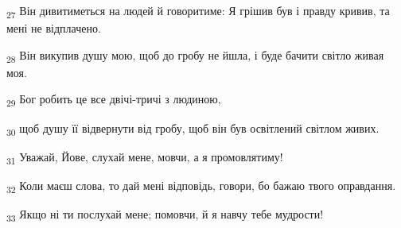 \begin{tcolorbox}
\textsubscript{27} Він дивитиметься на людей й говоритиме: Я грішив був і правду кривив, та мені не відплачено.
\end{tcolorbox}
\begin{tcolorbox}
\textsubscript{28} Він викупив душу мою, щоб до гробу не йшла, і буде бачити світло живая моя.
\end{tcolorbox}
\begin{tcolorbox}
\textsubscript{29} Бог робить це все двічі-тричі з людиною,
\end{tcolorbox}
\begin{tcolorbox}
\textsubscript{30} щоб душу її відвернути від гробу, щоб він був освітлений світлом живих.
\end{tcolorbox}
\begin{tcolorbox}
\textsubscript{31} Уважай, Йове, слухай мене, мовчи, а я промовлятиму!
\end{tcolorbox}
\begin{tcolorbox}
\textsubscript{32} Коли маєш слова, то дай мені відповідь, говори, бо бажаю твого оправдання.
\end{tcolorbox}
\begin{tcolorbox}
\textsubscript{33} Якщо ні ти послухай мене; помовчи, й я навчу тебе мудрости!
\end{tcolorbox}
